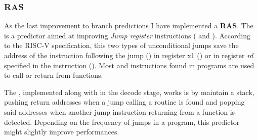 \documentclass[12pt,oneside,a4paper]{article}
\begin{document}
\subsubsection{RAS}

As the last improvement to branch predictions I have implemented a \textbf{RAS}. The {\selectfont{Return Address Stack}} is a predictor aimed at improving \textit{Jump register} instructions ({\selectfont{JALR}} and {\selectfont{JAL}}). According to the RISC-V specification, this two types of unconditional jumps save the address of the instruction following the jump ({\selectfont{pc+4}}) in register x1 ({\selectfont{JAL}}) or in  register \textit{rd} specified in the instruction ({\selectfont{JALR}}). Most {\selectfont{JAL}} and {\selectfont{JALR}} instructions found in programs are used to call or return from functions.

The {\selectfont{RAS}}, implemented along with {\selectfont{BHT}} in the decode stage, works is by maintain a stack, pushing return addresses when a jump calling a routine is found and popping said addresses when another jump instruction returning from a function is detected. Depending on the frequency of jumps in a program, this predictor might slightly improve performances. 



\printbibliography
\end{document}
